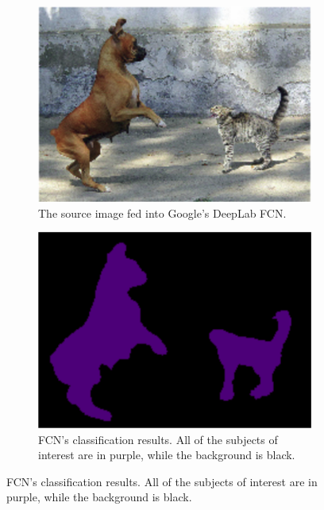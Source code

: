 \begin{figure}
	\centering
	
	\begin{subfigure}[h]{0.4\textwidth}
		\centering
		\includegraphics[width=\textwidth]{images/fcn-before.png}
		\caption{The source image fed into Google's DeepLab FCN.}
		\label{fig:fcn-before}
	\end{subfigure}

	\begin{subfigure}[h]{0.4\textwidth}
		\centering
		\includegraphics[width=\textwidth]{images/fcn-segmap.png}
		\caption{FCN's classification results. All of the subjects of interest are
		in purple, while the background is black.}
		\label{fig:fcn-segmap}
	\end{subfigure}


\end{figure}
